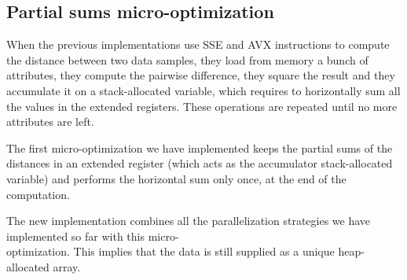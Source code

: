 \documentclass{article}
\begin{document}

\hypertarget{micro-optimization-partial-sum}{%
\subsection{Partial sums micro-optimization}\label{micro-optimization-partial-sum}}

When the previous implementations use SSE and AVX instructions to compute the distance between
two data samples, they load from memory a bunch of attributes, they compute the pairwise
difference, they square the result and they accumulate it on a stack-allocated variable, which
requires to horizontally sum all the values in the extended registers.
These operations are repeated until no more attributes are left.

The first micro-optimization we have implemented keeps the partial sums of the distances in an
extended register (which acts as the accumulator stack-allocated variable) and performs the
horizontal sum only once, at the end of the computation.

The new implementation combines all the parallelization strategies we have implemented so far
with this micro-\\optimization.
This implies that the data is still supplied as a unique heap-allocated array.
\end{document}
